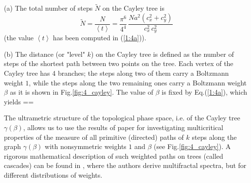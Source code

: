 (a) The total number of steps $\tilde{N}$ on the Cayley tree is
$$
\tilde{N}=\frac{N}{\left<t\right>}=
\frac{\pi^6}{4^4}\,\frac{N a^2(c_x^2+c_y^2)}{c_x^2\,c_y^2}
$$
(the value $\left<t\right>$ has been computed in (\ref{1:4a})).

(b) The distance (or "level" $k$) on the Cayley tree is defined as the number of steps of the shortest path between two points on the tree. Each
vertex of the Cayley tree has 4 branches; the steps along two of them carry a Boltzmann weight $1$, while the steps along the two remaining ones carry a Boltzmann weight $\beta$ as it is shown in Fig.\ref{fig:4_cayley}. 
The value of $\beta$ is fixed by Eq.(\ref{1:4a}), which yields
\be \label{1:4c}
\beta==
\ee

The ultrametric structure of the topological phase space, i.e. of the Cayley
tree $\gamma(\beta)$, allows us to use the results of  paper
\cite{procacc} for investigating multicritical properties of the measure of
all primitive (directed) paths of $k$ steps along the graph
$\gamma(\beta)$ with nonsymmetric weights $1$ and $\beta$ (see 
Fig.\ref{fig:4_cayley}). A rigorous  mathematical description of such weighted paths on trees (called cascades) can be found in \cite{holley}, where the authors derive multifractal spectra, but  for different distributions of weights.

